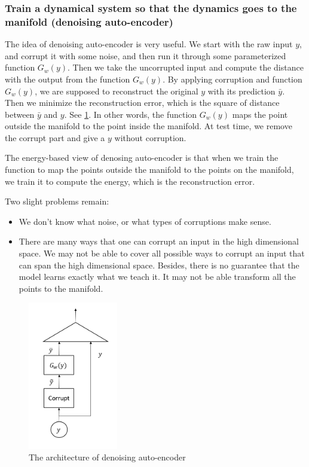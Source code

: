 \subsubsection{Train a dynamical system so that the dynamics goes to the manifold (denoising auto-encoder)}

The idea of denoising auto-encoder is very useful. 
We start with the raw input $y$, and corrupt it with some noise, and then run it through some parameterized function $G_w(y)$. 
Then we take the uncorrupted input and compute the distance with the output from the function $G_w(y)$. 
By applying corruption and function $G_w(y)$, we are supposed to reconstruct the original $y$ with its prediction $\bar y$. 
Then we minimize the reconstruction error, which is the square of distance between $\bar y$ and $y$.
See \ref{figure6}. 
In other words, the function $G_w(y)$ maps the point outside the manifold to the point inside the manifold. 
At test time, we remove the corrupt part and give a $y$ without corruption. 

The energy-based view of denosing auto-encoder is that when we train the function to map the points outside the manifold to the points on the manifold, we train it to compute the energy, which is the reconstruction error.

Two slight problems remain:

\begin{itemize}
    \item We don't know what noise, or what types of corruptions make sense.
    \item There are many ways that one can corrupt an input in the high dimensional space.
    We may not be able to cover all possible ways to corrupt an input that can span the high dimensional space. 
    Besides, there is no guarantee that the model learns exactly what we teach it. It may not be able transform all the points to the manifold.
\end{itemize}

\begin{figure}[htb]
    \centering
    \includegraphics[width=0.35\textwidth]{figs/PIC6.PNG}
    \caption{The architecture of denoising auto-encoder}
    \label{figure6}
\end{figure}


